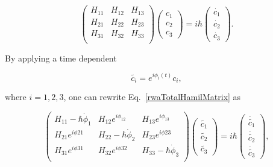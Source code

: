   \begin{equation}
  \begin{pmatrix}
  H_{11} & H_{12} & H_{13} \\   	H_{21} & H_{22} & H_{23} \\   	H_{31} & H_{32} & H_{33} \\
  \end{pmatrix}\begin{pmatrix}
  c_1\\c_2\\c_3
  \end{pmatrix} = i\hbar\begin{pmatrix}
  \dot{c_1} \\ \dot{c_2}\\\dot{c_3}
  \end{pmatrix}.
  \label{rwaTotalHamilMatrix}
  \end{equation}
  
  \noindent By applying a time dependent 
  
  \begin{equation}
  \label{eqn:InteractionTransformation}
  \widetilde{c_i} = e^{i\phi_{i}(t)}c_i,
  \end{equation}
  
  \noindent where $ i=1,2,3 $, one can rewrite Eq.~\eqref{rwaTotalHamilMatrix} as
  
  \begin{equation}
  \begin{pmatrix}
  H_{11}-\hbar\dot{\phi}_1 & H_{12}e^{i\phi_{12}} & H_{13}e^{i\phi_{13}} \\  H_{21}e^{i\phi{21}} & H_{22}-\hbar\dot{\phi}_2 & H_{23}e^{i\phi{23}} \\   	H_{31}e^{i\phi{31}} & H_{32}e^{i\phi{32}} & H_{33}-\hbar\dot{\phi}_3 \\
  \end{pmatrix}\begin{pmatrix}
  \widetilde{c_1}\\\widetilde{c_2}\\\widetilde{c_3}
  \end{pmatrix} = i\hbar\begin{pmatrix}
  \dot{\widetilde{c_1}} \\ \dot{\widetilde{c_2}}\\\dot{\widetilde{c_3}}
  \end{pmatrix},
  \label{rawMatrixAfterTransformation}
  \end{equation}
  
